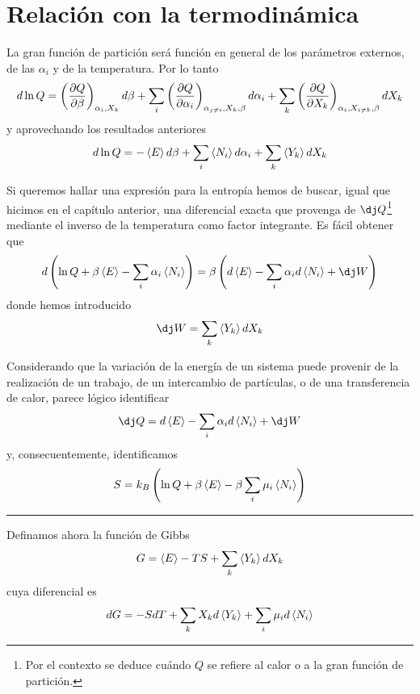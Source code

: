 \section{Relación con la termodinámica}

La gran función de partición será función en general de los parámetros externos, de las $\alpha_i$ y de la temperatura.
Por lo tanto
$$d\ln Q = \left( \pdv{Q}{\beta} \right)_{\alpha_i, X_k} d\beta + \sum_i \left( \pdv{Q}{\alpha_i} \right)_{\alpha_{j\neq i}, X_k, \beta} d\alpha_i + \sum_k \left(  \pdv{Q}{X_k} \right)_{\alpha_i, X_{i \neq k}, \beta} dX_k$$
y aprovechando los resultados anteriores
\begin{equation}
	d\ln Q = -\expval{E} d\beta + \sum_i \expval{N_i} d\alpha_i + \sum_k \expval{Y_k} dX_k
\end{equation}

Si queremos hallar una expresión para la entropía hemos de buscar, igual que hicimos en el capítulo anterior, una diferencial exacta que provenga de $\dj Q$\footnote{Por el contexto se deduce cuándo $Q$ se refiere al calor o a la gran función de partición.} mediante el inverso de la temperatura como factor integrante.
Es fácil obtener que
\begin{equation}
	d\left( \ln Q  + \beta \expval{E} -\sum_i \alpha_i \expval{N_i} \right) = \beta \left( d\expval{E} - \sum_i \alpha_i  d\expval{N_i} + \dj W \right)
\end{equation}
donde hemos introducido
$$\dj W = \sum_k \expval{Y_k} dX_k$$

Considerando que la variación de la energía de un sistema puede provenir de la realización de un trabajo, de un intercambio de partículas, o de una transferencia de calor, parece lógico identificar
$$\dj Q = d\expval{E} - \sum_i \alpha_i  d\expval{N_i} + \dj W$$
y, consecuentemente, identificamos
\begin{equation}\label{eq:S_T3}
	S = k_B \left( \ln Q  + \beta \expval{E} -\beta \sum_i \mu_i \expval{N_i} \right)
\end{equation}

\begin{center}
	\rule[0.5ex]{5em}{0.55pt}
\end{center}

Definamos ahora la función de Gibbs
\begin{equation}
	G = \expval{E} - TS + \sum_k \expval{Y_k} dX_k \label{eq:Gibb}
\end{equation}
cuya diferencial es
\begin{equation}
	dG = -SdT + \sum_k X_k d\expval{Y_k} + \sum_i \mu_i d\expval{N_i}
\end{equation}

